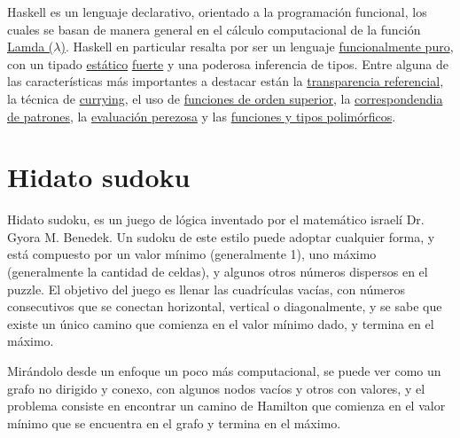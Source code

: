 \documentclass[10pt]{amsart}
\begin{document}
       Haskell es un lenguaje declarativo, orientado a la programaci\'on funcional, los cuales se basan de manera general en el c\'alculo computacional de la funci\'on \href{https://es.wikipedia.org/wiki/C%C3%A1lculo_lambda}{Lamda ($\lambda$)}. Haskell en particular resalta por ser un lenguaje \href{https://es.wikipedia.org/wiki/Programaci%C3%B3n_funcional#Funciones_puras}{funcionalmente puro}, con un tipado \href{https://es.wikipedia.org/wiki/Sistema_de_tipos#:~:text=Se%20dice%20de%20un%20lenguaje,C%2B%2B%2C%20Java%20y%20Haskell.}{est\'atico} \href{https://es.wikipedia.org/wiki/Tipado_fuerte}{fuerte} y una poderosa inferencia de tipos. Entre alguna de las caracter\'isticas m\'as importantes a destacar est\'an la \href{https://es.wikipedia.org/wiki/Transparencia_referencial#:~:text=La%20transparencia%20referencial%20es%20un,diferir%20de%20la%20del%20original%22.}{transparencia referencial},  la t\'ecnica de \href{https://en.wikipedia.org/wiki/Currying}{currying}, el uso de \href{https://wiki.uqbar.org/wiki/articles/orden-superior.html}{funciones de orden superior}, la \href{https://en.wikibooks.org/wiki/Haskell/Pattern_matching}{correspondendia de patrones}, la \href{https://hmn.wiki/es/Lazy_evaluation}{evaluaci\'on perezosa} y las \href{https://cs.famaf.unc.edu.ar/~hoffmann/pd18/practico01.html#tipos-recursivos-y-polim%C3%B3rficos}{funciones y tipos polim\'orficos}. 

        \section*{Hidato sudoku}

        Hidato sudoku, es un juego de lógica inventado por el matemático israelí Dr. Gyora M. Benedek. Un sudoku de este estilo puede adoptar cualquier forma, y est\'a compuesto por un valor m\'inimo (generalmente 1), uno m\'aximo (generalmente la cantidad de celdas), y algunos otros n\'umeros dispersos en el puzzle. El objetivo del juego es llenar las cuadrículas vac\'ias, con números consecutivos que se conectan horizontal, vertical o diagonalmente, y se sabe que existe un \'unico camino que comienza en el valor m\'inimo dado, y termina en el m\'aximo.

        Mir\'andolo desde un enfoque un poco m\'as computacional, se puede ver como un grafo no dirigido y conexo, con algunos nodos vac\'ios y otros con valores, y el problema consiste en encontrar un camino de Hamilton que comienza en el valor m\'inimo que se encuentra en el grafo y termina en el m\'aximo.
\end{document}
